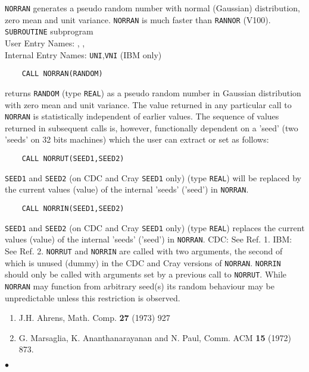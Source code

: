                                
                     
                 
    
{\tt NORRAN} generates a pseudo random number with normal (Gaussian)
distribution, zero mean and unit variance. {\tt NORRAN} is much faster
than {\tt RANNOR} (V100).
\Structure
{\tt SUBROUTINE} subprogram  \\
User Entry Names: , , \\
Internal Entry Names: {\tt UNI},{\tt VNI} (IBM only)
\Usage
\begin{verbatim}
    CALL NORRAN(RANDOM)
\end{verbatim}
returns {\tt RANDOM} (type {\tt REAL}) as a pseudo random number in
Gaussian distribution with zero mean and unit variance. The value
returned in any particular call to {\tt NORRAN} is statistically
independent of earlier values. The sequence of values returned in
subsequent calls is, however, functionally dependent on a 'seed'
(two 'seeds' on 32 bits machines) which the user can extract or set as
follows:
\begin{verbatim}
    CALL NORRUT(SEED1,SEED2)
\end{verbatim}
{\tt SEED1} and {\tt SEED2} (on CDC and Cray {\tt SEED1} only)
(type {\tt REAL}) will be replaced by the current values (value) of the
internal 'seeds' ('seed') in {\tt NORRAN}.
\begin{verbatim}
    CALL NORRIN(SEED1,SEED2)
\end{verbatim}
{\tt SEED1} and {\tt SEED2} (on CDC and Cray {\tt SEED1} only)
(type {\tt REAL}) replaces the current values (value) of the internal
'seeds' ('seed') in {\tt NORRAN}.
\Method
CDC: See Ref. 1. IBM: See Ref. 2.
\Notes
{\tt NORRUT} and {\tt NORRIN} are called with two arguments,
the second of which is unused (dummy) in the CDC and Cray versions of
{\tt NORRAN}. {\tt NORRIN} should only be called with arguments set by
a previous call to {\tt NORRUT}. While {\tt NORRAN} may function from
arbitrary seed(s) its random behaviour may be unpredictable unless this
restriction is observed.
\Refer
\begin{enumerate}
\item J.H. Ahrens,  Math. Comp. {\bf 27} (1973) 927
\item G. Marsaglia, K. Ananthanarayanan and N. Paul,
Comm. ACM {\bf 15} (1972) 873.
\end{enumerate}
$\bullet$

